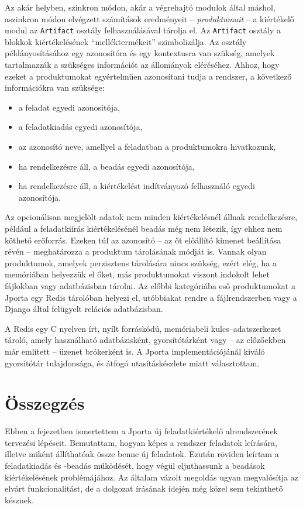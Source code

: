 Az akár helyben, szinkron módon, akár a végrehajtó modulok által máshol, aszinkron módon elvégzett számítások eredményeit -- \textit{produktumait} -- a kiértékelő modul az \texttt{Artifact} osztály felhasználásával tárolja el.
Az \texttt{Artifact} osztály a blokkok kiértékelésének ``melléktermékeit'' szimbolizálja.
Az osztály példányosításához egy azonosítóra és egy kontextusra van szükség, amelyek tartalmazzák a szükséges információt az állományok eléréséhez.
Ahhoz, hogy ezeket a produktumokat egyértelműen azonosítani tudja a rendszer, a következő információkra van szüksége:
\begin{itemize}
    \item a feladat egyedi azonosítója,
    \item a feladatkiadás egyedi azonosítója,
    \item az azonosító neve, amellyel a feladatban a produktumokra hivatkozunk,
    \item ha rendelkezésre áll, a beadás egyedi azonosítója,
    \item ha rendelkezésre áll, a kiértékelést indítványozó felhasználó egyedi azonosítója.
\end{itemize}
Az opcionálisan megjelölt adatok nem minden kiértékelésnél állnak rendelkezésre, például a feladatkiírás kiértékelésénél beadás még nem létezik, így ehhez nem köthető erőforrás.
Ezeken túl az azonosító -- az őt előállító kimenet beállítása révén -- meghatározza a produktum tárolásának módját is.
Vannak olyan produktumok, amelyek perzisztens tárolására nincs szükség, ezért elég, ha a memóriában helyezzük el őket, más produktumokat viszont indokolt lehet fájlokban vagy adatbázisban tárolni.
Az előbbi kategóriába eső produktumokat a Jporta egy Redis tárolóban helyezi el, utóbbiakat rendre a fájlrendszerben vagy a Django által felügyelt relációs adatbázisban.

A Redis egy C nyelven írt, nyílt forráskódú, memóriabeli kulcs--adatszerkezet tároló, amely használható adatbázisként, gyorsítótárként vagy -- az előzőekben már említett -- üzenet brókerként is.
\cite{Redis}  %
A Jporta implementációjánál kiváló gyorsítótár tulajdonsága, és átfogó utasításkészlete miatt választottam.


\section{Összegzés}
Ebben a fejezetben ismertettem a Jporta új feladatkiértékelő alrendszerének tervezési lépéseit.
Bemutattam, hogyan képes a rendszer feladatok leírására, illetve miként állíthatóak össze benne új feladatok.
Ezután röviden leírtam a feladatkiadás és -beadás működését, hogy végül eljuthassunk a beadások kiértékelésének problémájához.
Az általam vázolt megoldás ugyan megvalósítja az elvárt funkcionalitást, de a dolgozat írásának idején még közel sem tekinthető késznek.

